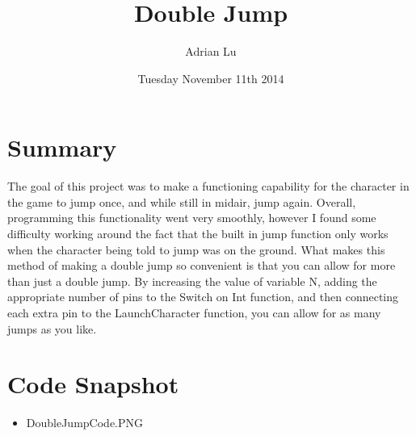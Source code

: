 \documentclass[a4paper]{article}
\title{Double Jump}
\author{Adrian Lu}
\date{Tuesday November 11th 2014}
\begin{document}
\maketitle

\section{Summary}

The goal of this project was to make a functioning capability for the character in the game to jump once, and while still in midair, jump again. Overall, programming this functionality went very smoothly, however I found some difficulty working around the fact that the built in jump function only works when the character being told to jump was on the ground. What makes this method of making a double jump so convenient is that you can allow for more than just a double jump. By increasing the value of variable N, adding the appropriate number of pins to the Switch on Int function, and then connecting each extra pin to the LaunchCharacter function, you can allow for as many jumps as you like.

\section{Code Snapshot}

\begin{itemize}
\item DoubleJumpCode.PNG
\end{itemize}
\end{document}
